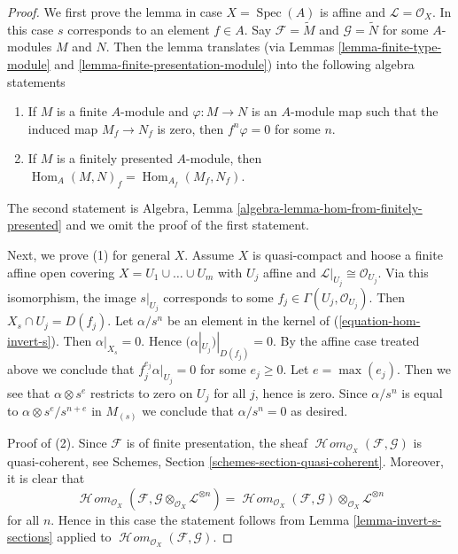 \documentclass{stacks-project}
\theoremstyle{plain}
\theoremstyle{definition}
\theoremstyle{remark}
\numberwithin{equation}{subsection}
\def\Spec{\mathop{\mathrm{Spec}}}
\def\Hom{\mathop{\mathrm{Hom}}\nolimits}
\def\SheafHom{\mathop{\mathcal{H}\!\mathit{om}}\nolimits}
\begin{document}
\begin{proof}
We first prove the lemma in case $X = \Spec(A)$ is affine
and $\mathcal{L} = \mathcal{O}_X$. In this case $s$ corresponds
to an element $f \in A$. Say
$\mathcal{F} = \widetilde{M}$ and $\mathcal{G} = \widetilde{N}$
for some $A$-modules $M$ and $N$. Then the lemma translates
(via Lemmas \ref{lemma-finite-type-module} and
\ref{lemma-finite-presentation-module}) into
the following algebra statements
\begin{enumerate}
\item If $M$ is a finite $A$-module and $\varphi : M \to N$ is
an $A$-module map such that the induced map $M_f \to N_f$ is zero,
then $f^n\varphi = 0$ for some $n$.
\item If $M$ is a finitely presented $A$-module, then
$\Hom_A(M, N)_f = \Hom_{A_f}(M_f, N_f)$.
\end{enumerate}
The second statement is
Algebra, Lemma \ref{algebra-lemma-hom-from-finitely-presented} and we omit
the proof of the first statement.

\medskip\noindent
Next, we prove (1) for general $X$.
Assume $X$ is quasi-compact and hoose a finite affine open covering
$X = U_1 \cup \ldots \cup U_m$ with $U_j$ affine and
$\mathcal{L}|_{U_j} \cong \mathcal{O}_{U_j}$. Via this isomorphism,
the image $s|_{U_j}$ corresponds to some
$f_j \in \Gamma(U_j, \mathcal{O}_{U_j})$. Then
$X_s \cap U_j = D(f_j)$.
Let $\alpha/s^n$ be an element in the kernel of
(\ref{equation-hom-invert-s}). Then $\alpha|_{X_s} = 0$.
Hence $(\alpha|_{U_j})|_{D(f_j)} = 0$. By the affine case treated above
we conclude that $f_j^{e_j} \alpha|_{U_j} = 0$ for some
$e_j \geq 0$. Let $e = \max(e_j)$. Then we see that $\alpha \otimes s^e$
restricts to zero on $U_j$ for all $j$, hence is zero. Since $\alpha/s^n$
is equal to $\alpha \otimes s^e/s^{n + e}$ in $M_{(s)}$ we conclude that
$\alpha/s^n = 0$ as desired.

\medskip\noindent
Proof of (2). Since $\mathcal{F}$ is of finite presentation, the
sheaf $\SheafHom_{\mathcal{O}_X}(\mathcal{F}, \mathcal{G})$ is
quasi-coherent, see Schemes, Section \ref{schemes-section-quasi-coherent}.
Moreover, it is clear that
$$
\SheafHom_{\mathcal{O}_X}(\mathcal{F},
\mathcal{G} \otimes_{\mathcal{O}_X} \mathcal{L}^{\otimes n}) =
\SheafHom_{\mathcal{O}_X}(\mathcal{F}, \mathcal{G})
\otimes_{\mathcal{O}_X} \mathcal{L}^{\otimes n}
$$
for all $n$. Hence in this case the statement follows from
Lemma \ref{lemma-invert-s-sections} applied to
$\SheafHom_{\mathcal{O}_X}(\mathcal{F}, \mathcal{G})$.
\end{proof}
\end{document}
